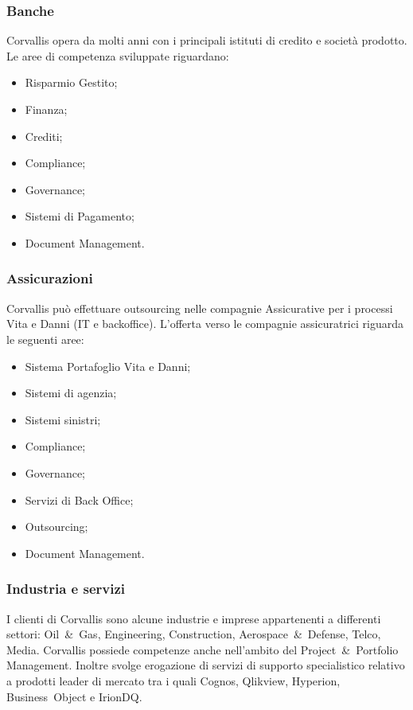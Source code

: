 \subsubsection{Banche}
\label{1.2.1}
Corvallis opera da molti anni con i principali istituti di credito e società prodotto. Le aree di competenza sviluppate riguardano:
\begin{itemize}
\item Risparmio Gestito;
\item Finanza;
\item Crediti;
\item Compliance;
\item Governance;
\item Sistemi di Pagamento;
\item Document Management.\\
\end{itemize}
\subsubsection{Assicurazioni}
\label{1.2.2}
Corvallis può effettuare outsourcing nelle compagnie Assicurative per i processi Vita e Danni (IT e backoffice). L'offerta verso le compagnie assicuratrici riguarda le seguenti aree:
\begin{itemize}
\item Sistema Portafoglio Vita e Danni;
\item Sistemi di agenzia;
\item Sistemi sinistri;
\item Compliance;
\item Governance;
\item Servizi di Back Office;
\item Outsourcing;
\item Document Management.
\end{itemize}

\subsubsection{Industria e servizi}
\label{1.2.3}
I clienti di Corvallis sono alcune industrie e imprese appartenenti a differenti settori: Oil~\&~Gas, Engineering, Construction, Aerospace~\&~Defense, Telco, Media. Corvallis possiede competenze anche nell'ambito del Project~\&~Portfolio Management. Inoltre svolge erogazione di servizi di supporto specialistico relativo a prodotti leader di mercato tra i quali Cognos, Qlikview, Hyperion, Business~Object e IrionDQ.
